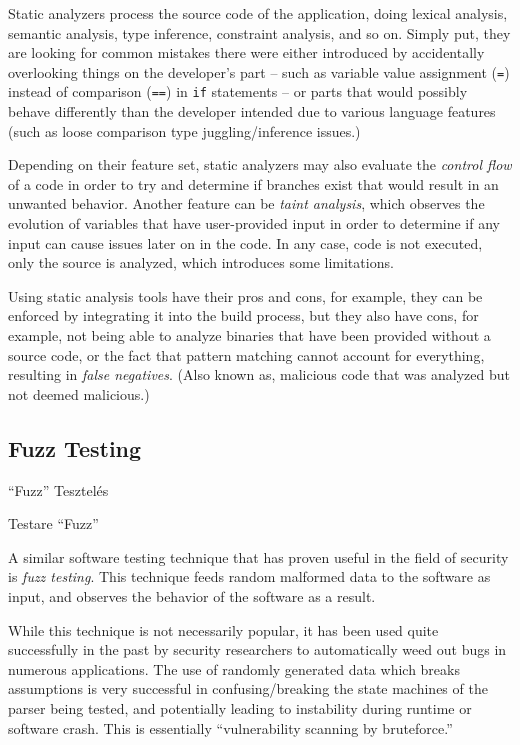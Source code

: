 \documentclass[a4paper,12pt]{article}
\newcommand\subsectionhu[1]{\addcontentsline{toc.hu}{subsection} {\protect\numberline{\thesubsection} #1}}
\newcommand\subsectionro[1]{\addcontentsline{toc.ro}{subsection} {\protect\numberline{\thesubsection} #1}}
\begin{document}
	Static analyzers process the source code of the application, doing lexical analysis, semantic analysis, type inference, constraint analysis, and so on. Simply put, they are looking for common mistakes there were either introduced by accidentally overlooking things on the developer's part -- such as variable value assignment (\texttt{=}) instead of comparison (\texttt{==}) in \texttt{if} statements -- or parts that would possibly behave differently than the developer intended due to various language features (such as loose comparison type juggling/inference issues.)
	
	Depending on their feature set, static analyzers may also evaluate the \textit{control flow} of a code in order to try and determine if branches exist that would result in an unwanted behavior. Another feature can be \textit{taint analysis}, which observes the evolution of variables that have user-provided input in order to determine if any input can cause issues later on in the code. In any case, code is not executed, only the source is analyzed, which introduces some limitations.
	
	Using static analysis tools have their pros and cons, for example, they can be enforced by integrating it into the build process, but they also have cons, for example, not being able to analyze binaries that have been provided without a source code, or the fact that pattern matching cannot account for everything, resulting in \textit{false negatives}. (Also known as, malicious code that was analyzed but not deemed malicious.)
	
\subsection{Fuzz Testing}
\subsectionhu{``Fuzz'' Tesztelés} \subsectionro{Testare ``Fuzz''}
	
	A similar software testing technique that has proven useful in the field of security is \textit{fuzz testing}. This technique feeds random malformed data to the software as input, and observes the behavior of the software as a result.
	
	While this technique is not necessarily popular, it has been used quite successfully in the past by security researchers to automatically weed out bugs in numerous applications.\cite{mzalewski15} The use of randomly generated data which breaks assumptions is very successful in confusing/breaking the state machines of the parser being tested, and potentially leading to instability during runtime or software crash. This is essentially ``vulnerability scanning by bruteforce.''
	
\end{document}

